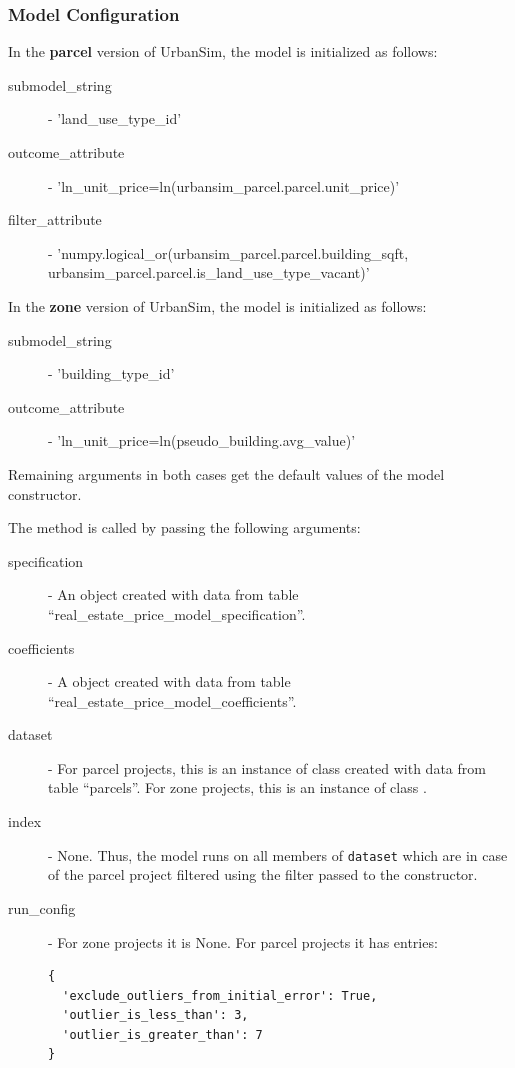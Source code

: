 \subsubsection{Model Configuration}
%
In the {\bf parcel} version of UrbanSim, the model is initialized as follows:
\begin{description}
\item[submodel_string] - 'land_use_type_id'
\item[outcome_attribute] - 'ln_unit_price=ln(urbansim_parcel.parcel.unit_price)'
\item[filter_attribute] - 'numpy.logical_or(urbansim_parcel.parcel.building_sqft, urbansim_parcel.parcel.is_land_use_type_vacant)'
\end{description}

In the {\bf zone} version of UrbanSim, the model is initialized as follows:
\begin{description}
\item[submodel_string] - 'building_type_id'
\item[outcome_attribute] - 'ln_unit_price=ln(pseudo_building.avg_value)'
\end{description}
Remaining arguments in both cases get the default values of the model 
constructor.

The  method is called by passing the
following arguments:
\begin{description}
\item[specification] - An
 object created with data from table
``real_estate_price_model_specification''. 
\item[coefficients] - A  object created
with data from table ``real_estate_price_model_coefficients''.
\item[dataset] - For parcel projects, this is an instance of class  created with data
  from table ``parcels''. For zone projects, this is an instance of class .
\item[index] - None. Thus, the model runs on all members of \verb|dataset| which are in case of the parcel project 
filtered using the filter passed to the constructor.
\item[run_config] - For zone projects it is None. For parcel projects it has entries:
\begin{verbatim}
{
  'exclude_outliers_from_initial_error': True, 
  'outlier_is_less_than': 3, 
  'outlier_is_greater_than': 7
}
\end{verbatim}
\end{description}
%

